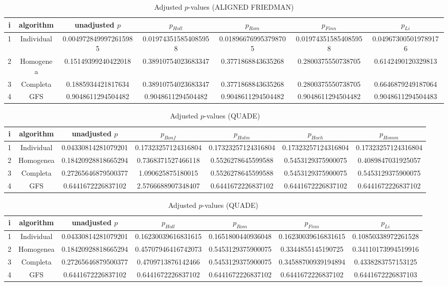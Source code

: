 \documentclass[a4paper,10pt]{article}
\begin{document}
\begin{landscape}
\begin{table}[!htp]
\centering\scriptsize
\caption{Adjusted $p$-values (ALIGNED FRIEDMAN)}
\begin{tabular}{ccccccc}
i&algorithm&unadjusted $p$&$p_{Holl}$&$p_{Rom}$&$p_{Finn}$&$p_{Li}$\\
\hline
1&Individual&0.0049728499972615985&0.019743515854085958&0.018966769953798705&0.019743515854085958&0.049673005019789176\\
2&Homogenea&0.15149399240422018&0.38910754023683347&0.3771868843635268&0.2800375550738705&0.6142490120329813\\
3&Completa&0.1885934421817634&0.38910754023683347&0.3771868843635268&0.2800375550738705&0.6646879249187064\\
4&GFS&0.9048611294504482&0.9048611294504482&0.9048611294504482&0.9048611294504482&0.9048611294504483\\
\hline
\end{tabular}
\end{table}


\newpage

\begin{table}[!htp]
\centering\scriptsize
\caption{Adjusted $p$-values (QUADE)}
\begin{tabular}{ccccccc}
i&algorithm&unadjusted $p$&$p_{Bonf}$&$p_{Holm}$&$p_{Hoch}$&$p_{Homm}$\\
\hline
1&Individual&0.04330814281079201&0.17323257124316804&0.17323257124316804&0.17323257124316804&0.17323257124316804\\
2&Homogenea&0.18420928818665294&0.7368371527466118&0.5526278645599588&0.5453129375900075&0.4089847031925057\\
3&Completa&0.27265646879500377&1.090625875180015&0.5526278645599588&0.5453129375900075&0.5453129375900075\\
4&GFS&0.6441672226837102&2.5766688907348407&0.6441672226837102&0.6441672226837102&0.6441672226837102\\
\hline
\end{tabular}
\end{table}

\begin{table}[!htp]
\centering\scriptsize
\caption{Adjusted $p$-values (QUADE)}
\begin{tabular}{ccccccc}
i&algorithm&unadjusted $p$&$p_{Holl}$&$p_{Rom}$&$p_{Finn}$&$p_{Li}$\\
\hline
1&Individual&0.04330814281079201&0.16230039616831615&0.1651800440936048&0.16230039616831615&0.10850338972261528\\
2&Homogenea&0.18420928818665294&0.45707946416742073&0.5453129375900075&0.3344855145190725&0.34110173994519916\\
3&Completa&0.27265646879500377&0.4709713876142466&0.5453129375900075&0.34588700939194894&0.4338283757153125\\
4&GFS&0.6441672226837102&0.6441672226837102&0.6441672226837102&0.6441672226837102&0.6441672226837103\\
\hline
\end{tabular}
\end{table}

\end{landscape}
\end{document}
